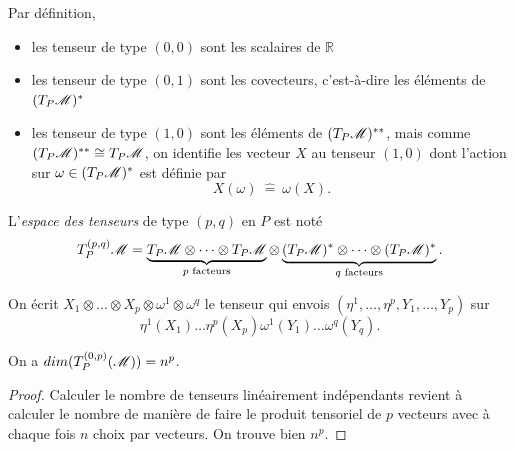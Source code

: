 \documentclass[a4paper,11pt]{report}
\begin{document}
                Par définition,
                \begin{itemize}[label = \textbullet]
                    \item les tenseur de type $(0,0)$ sont les scalaires de $\mathbb{R}$
                    \item les tenseur de type $(0,1)$ sont les covecteurs, c'est-à-dire les éléments de $(T_P\mathscr{M})^*$
                    \item les tenseur de type $(1,0)$ sont les éléments de $(T_P\mathscr{M})^{**}$, mais comme $(T_P\mathscr{M})^{**}\cong T_P\mathscr{M}$, on identifie les vecteur $X$ au tenseur $(1,0)$ dont l'action sur $\omega\in(T_P\mathscr{M})^*$ est définie par
                    \begin{equation}
                        X(\omega)~\hat{=}~\omega(X).
                    \end{equation}
                \end{itemize}
                
                \begin{definition}
                    L'\textit{espace des tenseurs} de type $(p,q)$ en $P$ est noté
                    \begin{equation}
                        T^{(p,q)}_P\mathscr{M} = \underbrace{T_P\mathscr{M}\otimes\dots\otimes T_P\mathscr{M}}_{\text{$p$ facteurs}}\otimes \underbrace{(T_P\mathscr{M})^*\otimes\dots\otimes (T_P\mathscr{M})^*}_{\text{$q$ facteurs}}.
                    \end{equation}
                \end{definition}
                
                On écrit $X_1\otimes\dots\otimes X_p\otimes\omega^1\otimes\omega^q$ le tenseur qui envois $(\eta^1,\dots,\eta^p,Y_1,\dots,Y_p)$ sur
                \begin{equation}
                    \eta^1(X_1)\dots\eta^p(X_p)\omega^1(Y_1)\dots\omega^q(Y_q).
                \end{equation}
                
                \begin{leftbar}
                \begin{prop}
                    On a $dim(T_P^{(0,p)}(\mathscr{M})) = n^p$.
                \end{prop}
                \end{leftbar}
                
                \begin{proof}
                    Calculer le nombre de tenseurs linéairement indépendants revient à calculer le nombre de manière de faire le produit tensoriel de $p$ vecteurs avec à chaque fois $n$ choix par vecteurs. On trouve bien $n^p$.
                \end{proof}
                
\end{document}
